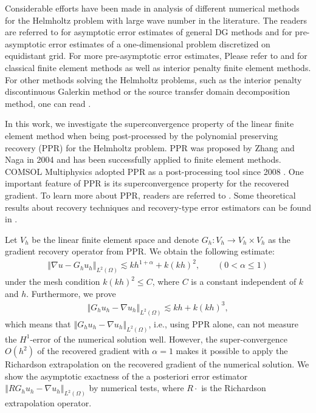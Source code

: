 \documentclass[leqno,final]{siamltex}
\numberwithin{equation}{section}
\newcommand{\norm}[1]{\left\Vert#1\right\Vert}
\newcommand{\ls}{\lesssim}
\newcommand{\al}{\alpha}
\newcommand{\na}{\nabla}
\newcommand{\Om}{\Omega}
\newcommand{\eq}[1]{\begin{align}#1\end{align}}
\newcommand{\eqn}[1]{\begin{align*}#1\end{align*}}
\begin{document}
Considerable efforts have been made in analysis of different numerical methods
for the Helmholtz problem with large wave number in the literature.
The readers are referred to \cite{ak79,dss94,sch74} for asymptotic error estimates of general DG methods and
\cite{ib95a,ib97} for pre-asymptotic error estimates of a one-dimensional problem discretized on equidistant grid.
For more pre-asymptotic error estimates, Please refer to \cite{ms10,ms11}
and \cite{zbw,zw} for classical finite element methods as well as interior penalty finite element methods.
For other methods solving the Helmholtz problems, such as the interior
penalty discontinuous Galerkin method or the source transfer domain decomposition method,
one can read \cite{mps13,fw09,fw11,zd,dzh,cx}.

In this work, we investigate the superconvergence property of the linear finite element method
when being post-processed by the polynomial preserving recovery (PPR) for the Helmholtz problem.
PPR was proposed by Zhang and Naga \cite{zn05} in 2004 and has been successfully applied to finite element methods.
COMSOL Multiphysics adopted PPR as a post-processing tool since 2008 \cite{comsol}.
One important feature of PPR is its superconvergence property for the recovered gradient.
To learn more about PPR, readers are referred to \cite{z04,z04t,nz04,wz07}.
Some theoretical results about recovery techniques and recovery-type error
estimators can be found in \cite{bx03,lmw,zl99,xz03,yz01}.

Let $V_h$ be the linear finite element space and denote $G_h:V_h\rightarrow V_h\times V_h$ as the gradient recovery operator from PPR.
We obtain the following estimate:
\eq{ \norm{\na u-G_hu_h}_{L^2(\Om)} \ls kh^{1+\al} + k(kh)^2, \qquad (0<\alpha\le 1) \label{eq_sec_gh}}
under the mesh condition $k(kh)^2\leq C$, where $C$ is a constant independent of $k$ and $h$. Furthermore, we prove
\eqn{ \norm{G_hu_h-\na u_h}_{L^2(\Om)} \ls kh + k(kh)^3, }
which means that $\norm{G_hu_h-\na u_h}_{L^2(\Om)}$, i.e., using PPR alone, can not measure the $H^1$-error of the numerical solution well. However, the super-convergence $O(h^2)$ of the recovered gradient with $\al=1$ makes it possible to apply
the Richardson extrapolation on the recovered gradient of the numerical solution. We show the asymptotic exactness of the a posteriori error estimator $\norm{RG_hu_h-\na u_h}_{L^2(\Om)}$ by numerical tests, where $R\cdot$ is the Richardson extrapolation operator.
\end{document}
